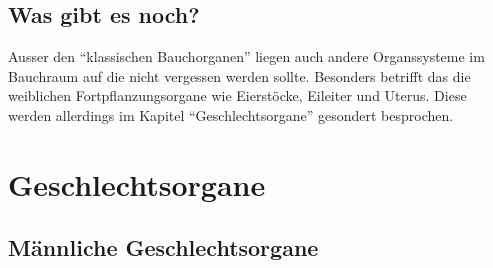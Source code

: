 \subsection{Was gibt es noch?}

Ausser den "`klassischen Bauchorganen"' liegen auch andere
Organssysteme im Bauchraum auf die nicht vergessen werden
sollte. Besonders betrifft das die weiblichen
Fortpflanzungsorgane wie Eierstöcke, Eileiter und Uterus.
Diese werden allerdings im Kapitel "`Geschlechtsorgane"'
gesondert besprochen. 

\section{Geschlechtsorgane}
\subsection{M\"annliche Geschlechtsorgane}

